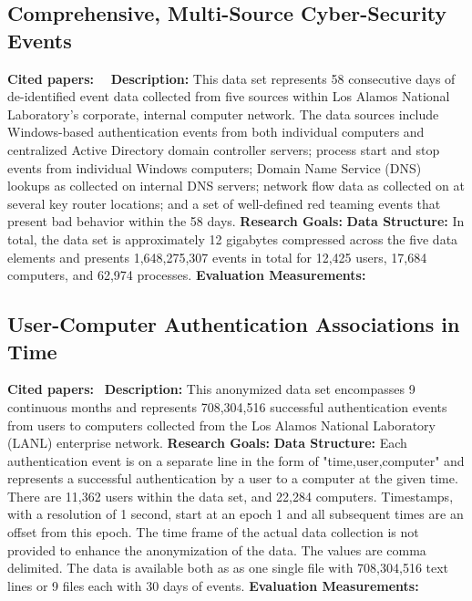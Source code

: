 \subsection{Comprehensive, Multi-Source Cyber-Security Events}
\textbf{Cited papers:}~\cite{akent-2015-enterprise-data}~\cite{pritom2017study} \newline
\textbf{Description:} This data set represents 58 consecutive days of de-identified event data collected from five sources within Los Alamos National Laboratory’s corporate, internal computer network. The data sources include Windows-based authentication events from both individual computers and centralized Active Directory domain controller servers; process start and stop events from individual Windows computers; Domain Name Service (DNS) lookups as collected on internal DNS servers; network flow data as collected on at several key router locations; and a set of well-defined red teaming events that present bad behavior within the 58 days. \newline
\textbf{Research Goals:}  \newline
\textbf{Data Structure:} In total, the data set is approximately 12 gigabytes compressed across the five data elements and presents 1,648,275,307 events in total for 12,425 users, 17,684 computers, and 62,974 processes.\newline
\textbf{Evaluation Measurements:} \newline

\subsection{User-Computer Authentication Associations in Time}
\textbf{Cited papers:}~\cite{hagberg2014connected} \newline
\textbf{Description:} This anonymized data set encompasses 9 continuous months and represents 708,304,516 successful authentication events from users to computers collected from the Los Alamos National Laboratory (LANL) enterprise network. \newline
\textbf{Research Goals:}  \newline
\textbf{Data Structure:} Each authentication event is on a separate line in the form of "time,user,computer" and represents a successful authentication by a user to a computer at the given time. There are 11,362 users within the data set, and 22,284 computers. Timestamps, with a resolution of 1 second, start at an epoch 1 and all subsequent times are an offset from this epoch. The time frame of the actual data collection is not provided to enhance the anonymization of the data. The values are comma delimited.  The data is available both as as one single file with 708,304,516 text lines or 9 files each with 30 days of events. \newline
\textbf{Evaluation Measurements:} \newline

